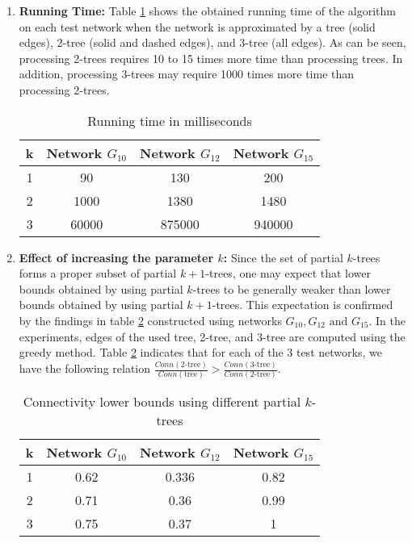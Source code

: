 \begin{enumerate}
\item \textbf{Running Time:} Table \ref{Tab:runtym} shows the obtained running time of the algorithm on each test network when the network is approximated by a tree (solid edges), 2-tree (solid and dashed edges), and 3-tree (all edges). As can be seen, processing 2-trees requires 10 to 15 times more time than processing trees. In addition, processing 3-trees may require 1000 times more time than processing 2-trees.

\begin{table}[!htb]

   
      \centering
     \begin{tabular}{|c|c|c|c|}
     \hline
         k& Network $G_{10}$ & Network $G_{12}$ & Network $G_{15}$ \\
     \hline
     1&90& 130& 200 \\\hline
     2&1000 &1380&1480	\\\hline
3 &60000&875000&940000	 \\\hline
\end{tabular}
 \caption{Running time in milliseconds}
\label{Tab:runtym}
\end{table}


\item \textbf{Effect of increasing the parameter $k$:}
Since the set of partial $k$-trees forms a proper subset of partial $k+1$-trees, one may expect that lower bounds obtained by using partial $k$-trees to be generally weaker than lower bounds obtained by using partial $k+1$-trees. This expectation is confirmed by the findings in table \ref{Tab:acc} constructed using networks $G_{10}, G_{12} \mbox{ and } G_{15}$. In the experiments, edges of the used tree, 2-tree, and 3-tree are computed using the greedy method. Table \ref{Tab:acc} indicates that for each of the 3 test networks, we have the following relation $\frac{Conn(\mbox{2-tree})}{Conn(\mbox{tree})}>\frac{Conn(\mbox{3-tree})}{Conn(\mbox{2-tree})}$.

   \begin{table}[!htb] 
      \centering
     \begin{tabular}{|c|c|c|c|}
     \hline
      k& Network $G_{10}$ & Network $G_{12}$ & Network $G_{15}$ \\
     \hline
      1 & 0.62&0.336& 0.82 \\\hline
2 &0.71 & 0.36& 0.99\\\hline
3 &0.75& 0.37& 1\\\hline
\end{tabular}
 \caption{Connectivity lower bounds using different partial $k$-trees}
 \label{Tab:acc}
\end{table}


\end{enumerate}
